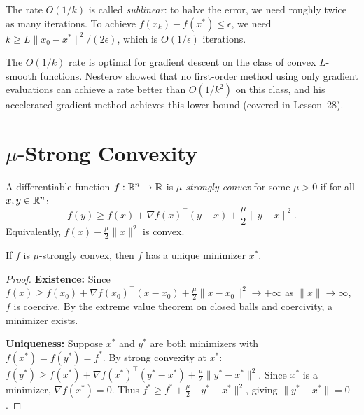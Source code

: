 \documentclass[11pt,a4paper]{article}
\begin{document}
\begin{remark}\label{rem:sublinear}
The rate $O(1/k)$ is called \emph{sublinear}: to halve the error, we need
roughly twice as many iterations. To achieve $f(x_k) - f(x^*) \le \epsilon$,
we need $k \ge L\|x_0 - x^*\|^2 / (2\epsilon)$, which is $O(1/\epsilon)$
iterations.
\end{remark}

\begin{remark}\label{rem:optimal-rate}
The $O(1/k)$ rate is optimal for gradient descent on the class of convex
$L$-smooth functions. Nesterov showed that no first-order method using only
gradient evaluations can achieve a rate better than $O(1/k^2)$ on this
class, and his accelerated gradient method achieves this lower bound
(covered in Lesson~28).
\end{remark}


\section{$\mu$-Strong Convexity}\label{sec:strong-convexity}

\begin{definition}\label{def:strong-convex}
A differentiable function $f : \mathbb{R}^n \to \mathbb{R}$ is \emph{$\mu$-strongly convex}
for some $\mu > 0$ if for all $x, y \in \mathbb{R}^n$:
\begin{equation}\label{eq:strong-convex}
  f(y) \ge f(x) + \nabla f(x)^\top(y - x) + \frac{\mu}{2}\|y - x\|^2.
\end{equation}
Equivalently, $f(x) - \frac{\mu}{2}\|x\|^2$ is convex.
\end{definition}

\begin{proposition}\label{prop:unique-min}
If $f$ is $\mu$-strongly convex, then $f$ has a unique minimizer $x^*$.
\end{proposition}

\begin{proof}
\textbf{Existence:} Since $f(x) \ge f(x_0) + \nabla f(x_0)^\top(x - x_0)
+ \frac{\mu}{2}\|x - x_0\|^2 \to +\infty$ as $\|x\| \to \infty$,
$f$ is coercive. By the extreme value theorem on closed balls and
coercivity, a minimizer exists.

\textbf{Uniqueness:} Suppose $x^*$ and $y^*$ are both minimizers with
$f(x^*) = f(y^*) = f^*$. By strong convexity at $x^*$:
$f(y^*) \ge f(x^*) + \nabla f(x^*)^\top(y^* - x^*) + \frac{\mu}{2}\|y^* - x^*\|^2$.
Since $x^*$ is a minimizer, $\nabla f(x^*) = 0$. Thus
$f^* \ge f^* + \frac{\mu}{2}\|y^* - x^*\|^2$, giving $\|y^* - x^*\| = 0$.
\end{proof}
\end{document}
